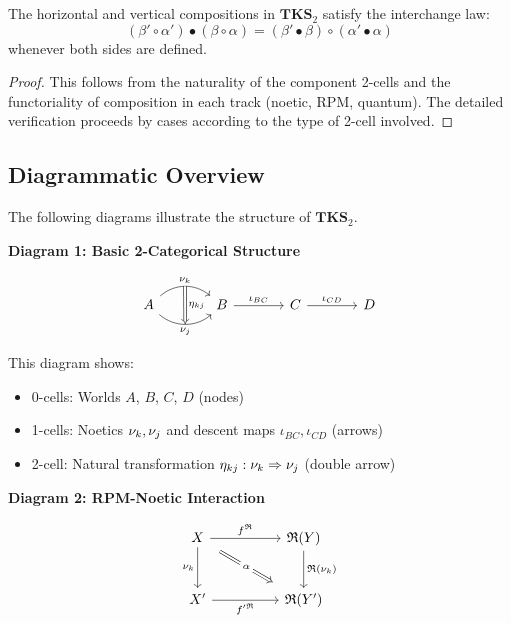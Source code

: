 \begin{theorem}
\label{thm:interchange-tks2}
The horizontal and vertical compositions in $\mathbf{TKS}_2$ satisfy the interchange law:
\[
(\beta' \circ \alpha') \bullet (\beta \circ \alpha) = (\beta' \bullet \beta) \circ (\alpha' \bullet \alpha)
\]
whenever both sides are defined.
\end{theorem}

\begin{proof}
This follows from the naturality of the component 2-cells and the functoriality of
composition in each track (noetic, RPM, quantum). The detailed verification proceeds
by cases according to the type of 2-cell involved.
\end{proof}

\subsection{Diagrammatic Overview}

The following diagrams illustrate the structure of $\mathbf{TKS}_2$.

\begin{center}
\textbf{Diagram 1: Basic 2-Categorical Structure}
\end{center}

\[
\begin{tikzcd}[column sep=large, row sep=large]
  A \arrow[r, bend left=40, "\noe{k}"{name=U}]
    \arrow[r, bend right=40, "\noe{j}"'{name=D}]
    \arrow[Rightarrow, from=U, to=D, "\eta_{kj}"]
  & B \arrow[r, "\iota_{BC}"]
  & C \arrow[r, "\iota_{CD}"]
  & D
\end{tikzcd}
\]

This diagram shows:
\begin{itemize}
  \item 0-cells: Worlds $A$, $B$, $C$, $D$ (nodes)
  \item 1-cells: Noetics $\nu_{k}, \nu_{j}$ and descent maps $\iota_{BC}, \iota_{CD}$ (arrows)
  \item 2-cell: Natural transformation $\eta_{kj} : \nu_{k} \Rightarrow \nu_{j}$ (double arrow)
\end{itemize}

\begin{center}
\textbf{Diagram 2: RPM-Noetic Interaction}
\end{center}

\[
\begin{tikzcd}[column sep=huge, row sep=large]
  X \arrow[r, "f^\RPM"]
    \arrow[d, "\noe{k}"']
  & \RPM(Y) \arrow[d, "\RPM(\noe{k})"]
  \\
  X' \arrow[r, "f'^\RPM"']
    \arrow[Rightarrow, from=1-1, to=2-2, shorten >=8pt, shorten <=8pt, "\alpha" description]
  & \RPM(Y')
\end{tikzcd}
\]

